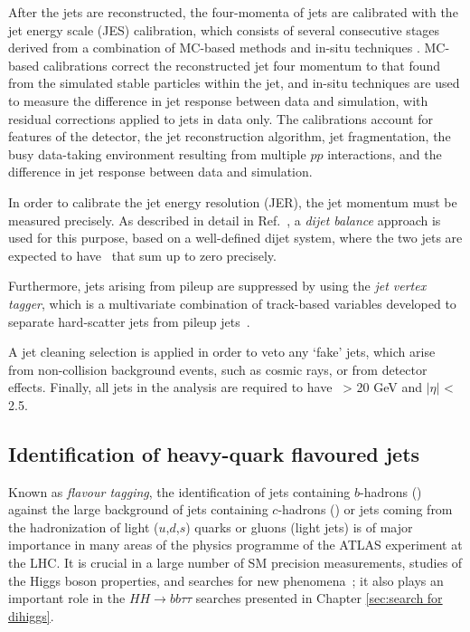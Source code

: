 After the jets are reconstructed, the four-momenta of jets
are calibrated with the jet energy scale (JES) calibration,
which consists of several consecutive stages derived from a
combination of MC-based methods and in-situ techniques \cite{PERF-2016-04}.
MC-based calibrations correct the reconstructed jet four momentum 
to that found from the simulated stable particles 
within the jet, and in-situ techniques are used to measure 
the difference in jet response between data and simulation, 
with residual corrections applied to jets in data only.
The calibrations account for features of the
detector, the jet reconstruction algorithm, jet fragmentation,
the busy data-taking environment resulting from multiple $pp$ 
interactions, and the difference in jet response between
data and simulation.


In order to calibrate the jet energy resolution (JER),
the jet momentum must be measured precisely. 
As described in detail in Ref.~\cite{JETM-2018-05},
a \textit{dijet balance} approach is used for this purpose,
based on a well-defined dijet system,
where the two jets are expected to have \pt\ that 
sum up to zero precisely.


Furthermore, jets arising from pileup are suppressed by using the 
\textit{jet vertex tagger}, which is a multivariate 
combination of track-based variables developed to separate 
hard-scatter jets from pileup jets~\cite{ATLAS-CONF-2014-018}.


A jet cleaning selection is applied in order to veto any `fake' jets, 
which arise from non-collision background events, such as cosmic rays, 
or from detector effects. 
Finally, all jets in the analysis are required to have \pt\ > 20 GeV 
and $|\eta|$ < 2.5.


\subsection{Identification of heavy-quark flavoured jets}
\label{sec:Flavour tagging}
Known as \textit{flavour tagging}, 
the identification of jets containing $b$-hadrons (\bjets) 
against the large background of jets containing $c$-hadrons 
(\cjets) or jets coming from the hadronization of light ($u$,$d$,$s$) 
quarks or gluons (light jets) is of major importance in many areas of the 
physics programme of the ATLAS experiment at the LHC. 
It is crucial in a large number of SM
precision measurements, studies of the Higgs boson properties, and 
searches for 
new phenomena~\cite{SUSY-2014-08, ATLAS-CONF-2018-043,Interpreting_Higgs_result};
it also plays an important role in 
the $HH \to bb\tau\tau$ searches 
presented in Chapter \ref{sec:search for dihiggs}. 


